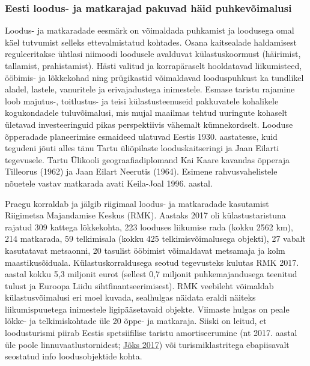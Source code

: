 \documentclass[estonian,]{article}
\begin{document}
\hypertarget{eesti-loodus--ja-matkarajad-pakuvad-huxe4id-puhkevuxf5imalusi}{%
\subsubsection*{Eesti loodus- ja matkarajad pakuvad häid puhkevõimalusi}\label{eesti-loodus--ja-matkarajad-pakuvad-huxe4id-puhkevuxf5imalusi}}

Loodus- ja matkaradade eesmärk on võimaldada puhkamist ja loodusega omal käel tutvumist selleks ettevalmistatud kohtades. Osana kaitsealade haldamisest reguleeritakse ühtlasi niimoodi loodusele avalduvat külastuskoormust (häirimist, tallamist, prahistamist). Hästi valitud ja korrapäraselt hooldatavad liikumisteed, ööbimis- ja lõkkekohad ning prügikastid võimaldavad looduspuhkust ka tundlikel aladel, lastele, vanuritele ja erivajadustega inimestele. Esmase taristu rajamine loob majutus-, toitlustus- ja teisi külastusteenuseid pakkuvatele kohalikele kogukondadele tuluvõimalusi, mis mujal maailmas tehtud uuringute kohaselt ületavad investeeringuid pikas perspektiivis vähemalt kümnekordselt.
Looduse õpperadade planeerimise esmaideed ulatuvad Eestis 1930. aastatesse, kuid tegudeni jõuti alles tänu Tartu üliõpilaste looduskaitseringi ja Jaan Eilarti tegevusele. Tartu Ülikooli geograafiadiplomand Kai Kaare kavandas õpperaja Tilleorus (1962) ja Jaan Eilart Neerutis (1964). Esimene rahvusvahelistele nõuetele vastav matkarada avati Keila-Joal 1996. aastal.

Praegu korraldab ja jälgib riigimaal loodus- ja matkaradade kasutamist Riigimetsa Majandamise Keskus (RMK). Aastaks 2017 oli külastustaristuna rajatud 309 kattega lõkkekohta, 223 looduses liikumise rada (kokku 2562 km), 214 matkarada, 59 telkimisala (kokku 425 telkimisvõimalusega objekti), 27 vabalt kasutatavat metsaonni, 20 tasulist ööbimist võimaldavat metsamaja ja kolm maastikusõiduala. Külastuskorraldusega seotud tegevusteks kulutas RMK 2017. aastal kokku 5,3 miljonit eurot (sellest 0,7 miljonit puhkemajandusega teenitud tulust ja Euroopa Liidu sihtfinantseerimisest). RMK veebileht võimaldab külastusvõimalusi eri moel kuvada, sealhulgas näidata eraldi näiteks liikumispuuetega inimestele ligipääsetavaid objekte. Viimaste hulgas on peale lõkke- ja telkimiskohtade üle 20 õppe- ja matkaraja. Siiski on leitud, et loodusturismi piirab Eestis spetsiifilise taristu amortiseerumine (nt 2017. aastal üle poole linnuvaatlustornidest; \protect\hyperlink{Juxf5ks2017}{Jõks 2017}) või turismiklastritega ebapiisavalt seostatud info loodusobjektide kohta.
\end{document}
